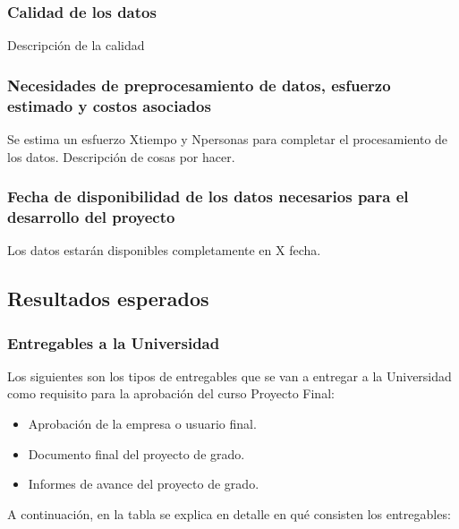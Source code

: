 \subsubsection{Calidad de los datos }
Descripción de la calidad

\subsubsection{Necesidades de preprocesamiento de datos, esfuerzo estimado y
costos asociados}
Se estima un esfuerzo Xtiempo y Npersonas para completar el procesamiento de los datos. Descripción de cosas por hacer.
\subsubsection{Fecha de disponibilidad de los datos necesarios para el
desarrollo del proyecto}
Los datos estarán disponibles completamente en X fecha.

\subsection{Resultados esperados}
\label{subsection:prop:resultados}



\subsubsection{Entregables a la Universidad}
Los siguientes son los tipos de entregables que se van a entregar a la Universidad como requisito para la aprobación del curso Proyecto Final:

\begin{itemize}
	\item Aprobación de la empresa o usuario final.
	\item Documento final del proyecto de grado.
	\item Informes de avance del proyecto de grado.
\end{itemize}

A continuación, en la tabla  se explica en detalle en qué consisten los entregables:

